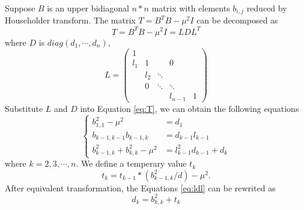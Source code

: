 Suppose $B$ is an upper bidiagonal $n*n$ matrix with elements $b_{i,j}$ reduced by Householder transform.
The matrix $T = B^T B - \mu^2 I$ can be decomposed as
\begin{equation}
\label{eq:T}
T = B^T B - \mu^2 I = L D L^T
\end{equation}
where $D$ is $diag(d_{1}, \cdots, d_{n})$,
\begin{equation}
 L =  \left( \begin{array}{ccccc}
     1&      &       &        &  \\
 l_{1}& 1    &       & 0      &  \\
      & l_{2}& \ddots&        &  \\
      & 0    & \ddots& \ddots &  \\
      &      &       & l_{n-1}& 1
\end{array} \right) 
\label{eq:l}
\end{equation}
Substitute $L$ and $D$ into Equation \ref{eq:T}, we can obtain the following equations
\begin{equation}
\left \{
\begin{aligned}
b_{1,1}^2 - \mu^2 &= d_1\\
b_{k-1,k-1} b_{k-1,k} &= d_{k-1} l_{k-1}\\
b_{k-1,k}^2 + b_{k,k}^2 - \mu^2 &= l_{k-1}^2 d_{k-1} + d_k
\end{aligned}
\right .
\label{eq:ldl}
\end{equation}
where $k = 2,3,\cdots,n$.
We define a temperary value $t_{k}$
\begin{equation}
t_{k} = t_{k-1} * (b_{k-1,k}^2 / d) - \mu^2.
\label{eq:tmp}
\end{equation}
After equivalent transformation, the Equations \ref{eq:ldl} can be rewrited as
\begin{equation}
\label{eq:negcount}
d_k = b_{k,k}^2 + t_{k}
\end{equation}

